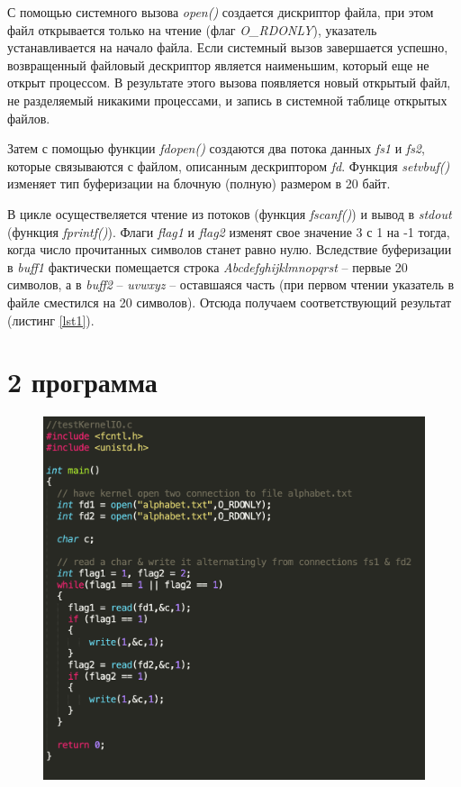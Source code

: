 \documentclass[a4paper,12pt]{article}
\begin{document}
	С помощью системного вызова \textit{open()} создается дискриптор файла, при
	этом файл открывается только на чтение (флаг \textit{O\_RDONLY}), указатель устанавливается на начало файла. Если системный вызов завершается успешно, возвращенный файловый дескриптор является наименьшим, который еще не открыт
	процессом. В результате этого вызова появляется новый открытый файл, не
	разделяемый никакими процессами, и запись в системной таблице открытых
	файлов.
	
	Затем с помощью функции \textit{fdopen()} создаются два потока данных \textit{fs1}
	и \textit{fs2}, которые связываются с файлом, описанным дескриптором \textit{fd}. Функция
	\textit{setvbuf()} изменяет тип буферизации на блочную (полную) размером в 20 байт.
	
	В цикле осуществеляется чтение из потоков (функция \textit{fscanf()}) и вывод
	в \textit{stdout} (функция \textit{fprintf()}). Флаги \textit{flag1} и \textit{flag2} изменят свое значение
	3
	с 1 на -1 тогда, когда число прочитанных символов станет равно нулю. Вследствие буферизации в \textit{buff1} фактически помещается строка \textit{Abcdefghijklmnopqrst}
	– первые 20 символов, а в \textit{buff2} – \textit{uvwxyz} – оставшаяся часть (при первом чтении
	указатель в файле сместился на 20 символов). Отсюда получаем соответствующий результат (листинг \ref{lst1}).
	
	\newpage
	
	\section*{2 программа}
	
	\begin{figure}[h!]
		\begin{center}
			{\includegraphics[scale = 0.7]{testKernelIO.png}}
			\label{ris:testKernelIO}
		\end{center}
	\end{figure}
	
\end{document}
